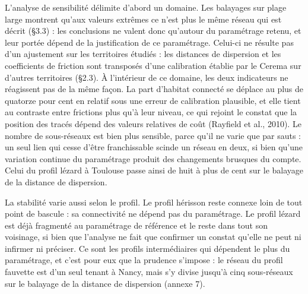 \documentclass[a4paper,12pt]{report}
\begin{document}
L'analyse de sensibilité délimite d'abord un domaine. Les balayages sur plage large montrent qu'aux valeurs extrêmes ce n'est plus le même réseau qui est décrit (§3.3) : les conclusions ne valent donc qu'autour du paramétrage retenu, et leur portée dépend de la justification de ce paramétrage. Celui-ci ne résulte pas d'un ajustement sur les territoires étudiés : les distances de dispersion et les coefficients de friction sont transposés d'une calibration établie par le Cerema sur d'autres territoires (§2.3). À l'intérieur de ce domaine, les deux indicateurs ne réagissent pas de la même façon. La part d'habitat connecté se déplace au plus de quatorze pour cent en relatif sous une erreur de calibration plausible, et elle tient au contraste entre frictions plus qu'à leur niveau, ce qui rejoint le constat que la position des tracés dépend des valeurs relatives de coût (Rayfield et al., 2010). Le nombre de sous-réseaux est bien plus sensible, parce qu'il ne varie que par sauts : un seul lien qui cesse d'être franchissable scinde un réseau en deux, si bien qu'une variation continue du paramétrage produit des changements brusques du compte. Celui du profil lézard à Toulouse passe ainsi de huit à plus de cent sur le balayage de la distance de dispersion.

La stabilité varie aussi selon le profil. Le profil hérisson reste connexe loin de tout point de bascule : sa connectivité ne dépend pas du paramétrage. Le profil lézard est déjà fragmenté au paramétrage de référence et le reste dans tout son voisinage, si bien que l'analyse ne fait que confirmer un constat qu'elle ne peut ni infirmer ni préciser. Ce sont les profils intermédiaires qui dépendent le plus du paramétrage, et c'est pour eux que la prudence s'impose : le réseau du profil fauvette est d'un seul tenant à Nancy, mais s'y divise jusqu'à cinq sous-réseaux sur le balayage de la distance de dispersion (annexe 7).
\end{document}
